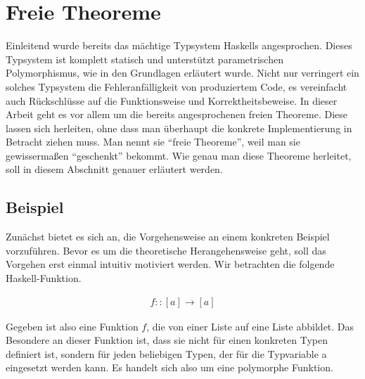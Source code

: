 \section{Freie Theoreme}

\label{sec:freie-theoreme}




Einleitend wurde bereits das mächtige Typsystem Haskells angesprochen. Dieses Typsystem ist komplett statisch und
unterstützt parametrischen Polymorphismus, wie in den Grundlagen erläutert wurde. Nicht nur verringert ein solches Typsystem
die Fehleranfälligkeit von produziertem Code, es vereinfacht auch Rückschlüsse auf die Funktionsweise und Korrektheitsbeweise.
In dieser Arbeit geht es vor allem um die bereits angesprochenen freien Theoreme. Diese lassen sich herleiten, ohne dass man
überhaupt die konkrete Implementierung in Betracht ziehen muss. Man nennt sie ``freie Theoreme'', weil man sie gewissermaßen
``geschenkt'' bekommt. Wie genau man diese Theoreme herleitet, soll in diesem Abschnitt genauer erläutert werden.


\subsection{Beispiel}

Zunächst bietet es sich an, die Vorgehensweise an einem konkreten Beispiel vorzuführen. Bevor es um die theoretische
Herangehensweise geht, soll das Vorgehen erst einmal intuitiv motiviert werden. Wir betrachten die folgende Haskell-Funktion.

\begin{align}
f :: [a] \rightarrow [a]
\end{align}

Gegeben ist also eine Funktion $f$, die von einer Liste auf eine Liste abbildet. Das Besondere an dieser Funktion ist, dass sie
nicht für einen konkreten Typen definiert ist, sondern für jeden beliebigen Typen, der für die Typvariable a eingesetzt werden
kann. Es handelt sich also um eine polymorphe Funktion.

